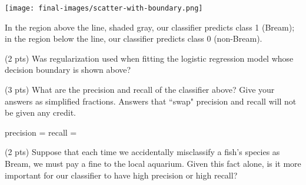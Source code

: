 \documentclass[twoside,12pt]{article}
\begin{document}
\begin{probset}
\begin{prob}[(20 pts)]
\vspace{-0.25in}

\begin{center}
\texttt{[image: final-images/scatter-with-boundary.png]}
\end{center}

\vspace{-0.1in}

In the region above the line, shaded gray, our classifier predicts class 1 (Bream); in the region below the line, our classifier predicts class 0 (non-Bream).

\begin{subprobset}

\begin{subprob}(2 pts) Was regularization used when fitting the logistic regression model whose decision boundary is shown above?



\end{subprob}

\vspace{0.2in}

\begin{subprob}(3 pts) What are the precision and recall of the classifier above? Give your answers as simplified fractions. Answers that ``swap" precision and recall will not be given any credit.

precision =  \hspace{0.4in} recall = 
    
\end{subprob}

\vspace{0.2in}

\begin{subprob}(2 pts) Suppose that each time we accidentally misclassify a fish's species as Bream, we must pay a fine to the local aquarium. Given this fact alone, is it more important for our classifier to have high precision or high recall?


    
\end{subprob}
    
\end{subprobset}


\end{prob}
\end{probset}
\end{document}
